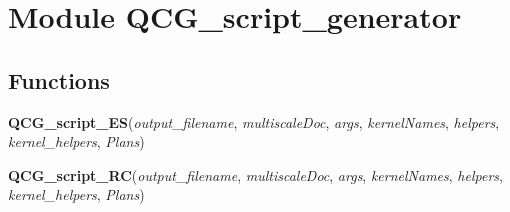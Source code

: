 %
%
%


\section{Module QCG\_script\_generator}

    \label{QCG_script_generator}


  \subsection{Functions}

    \label{QCG_script_generator:QCG_script_ES}

    \vspace{0.5ex}

\hspace{.8\funcindent}\begin{boxedminipage}{\funcwidth}

    \raggedright \textbf{QCG\_script\_ES}(\textit{output\_filename}, \textit{multiscaleDoc}, \textit{args}, \textit{kernelNames}, \textit{helpers}, \textit{kernel\_helpers}, \textit{Plans})

\setlength{\parskip}{2ex}
\setlength{\parskip}{1ex}
    \end{boxedminipage}

    \label{QCG_script_generator:QCG_script_RC}

    \vspace{0.5ex}

\hspace{.8\funcindent}\begin{boxedminipage}{\funcwidth}

    \raggedright \textbf{QCG\_script\_RC}(\textit{output\_filename}, \textit{multiscaleDoc}, \textit{args}, \textit{kernelNames}, \textit{helpers}, \textit{kernel\_helpers}, \textit{Plans})

\setlength{\parskip}{2ex}
\setlength{\parskip}{1ex}
    \end{boxedminipage}


